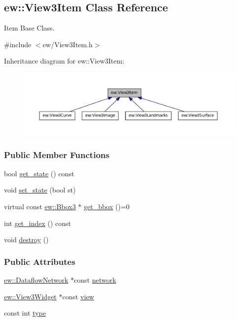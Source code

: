\hypertarget{classew_1_1View3Item}{
\subsection{ew::View3Item Class Reference}
\label{classew_1_1View3Item}
}


Item Base Class.  




{\ttfamily \#include $<$ew/View3Item.h$>$}



Inheritance diagram for ew::View3Item:
\nopagebreak
\begin{figure}[H]
\begin{center}
\leavevmode
\includegraphics[width=400pt]{classew_1_1View3Item__inherit__graph}
\end{center}
\end{figure}
\subsubsection*{Public Member Functions}
\begin{DoxyCompactItemize}
\item 
bool \hyperlink{classew_1_1View3Item_a73fa1808887496208897b56378d26cd3}{get\_\-state} () const 
\item 
void \hyperlink{classew_1_1View3Item_aebe04d5c9a8a8079d651d7ca179a312c}{set\_\-state} (bool st)
\item 
virtual const \hyperlink{classew_1_1Bbox3}{ew::Bbox3} $\ast$ \hyperlink{classew_1_1View3Item_a9591a8a9c68d627c93e4009c523767c2}{get\_\-bbox} ()=0
\item 
int \hyperlink{classew_1_1View3Item_a25a5d5d4e1fb109b8024966556f35ea2}{get\_\-index} () const 
\item 
void \hyperlink{classew_1_1View3Item_ac111273d2bb3433145be1506125a48de}{destroy} ()
\end{DoxyCompactItemize}
\subsubsection*{Public Attributes}
\begin{DoxyCompactItemize}
\item 
\hyperlink{classew_1_1DataflowNetwork}{ew::DataflowNetwork} $\ast$const \hyperlink{classew_1_1View3Item_af6294268d63629c620cebb3ece227c20}{network}
\item 
\hyperlink{classew_1_1View3Widget}{ew::View3Widget} $\ast$const \hyperlink{classew_1_1View3Item_a7d765842ec7b9e145cefa37e3dbae658}{view}
\item 
const int \hyperlink{classew_1_1View3Item_a7e21fcde8f082ba2409bcb2999a4b7fd}{type}
\end{DoxyCompactItemize}


